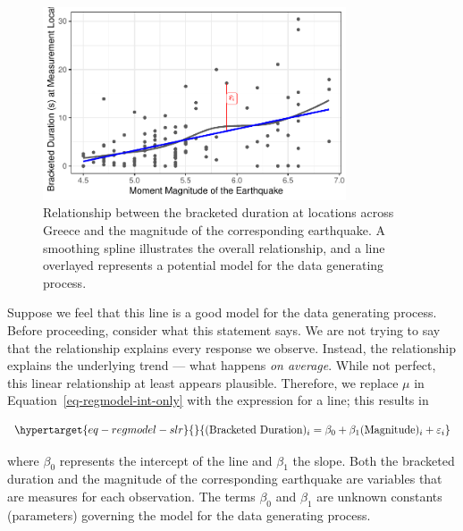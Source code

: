 \documentclass[
  letterpaper,
  DIV=11,
  numbers=noendperiod]{scrreprt}
\theoremstyle{plain}
\theoremstyle{definition}
\theoremstyle{definition}
\theoremstyle{remark}
\begin{document}
\begin{figure}

{\centering \includegraphics[width=0.8\textwidth,height=\textheight]{./images/fig-regmodel-slr-plot-1.pdf}

}

\caption{\label{fig-regmodel-slr-plot}Relationship between the bracketed
duration at locations across Greece and the magnitude of the
corresponding earthquake. A smoothing spline illustrates the overall
relationship, and a line overlayed represents a potential model for the
data generating process.}

\end{figure}

Suppose we feel that this line is a good model for the data generating
process. Before proceeding, consider what this statement says. We are
not trying to say that the relationship explains every response we
observe. Instead, the relationship explains the underlying trend ---
what happens \emph{on average}. While not perfect, this linear
relationship at least appears plausible. Therefore, we replace \(\mu\)
in Equation~\ref{eq-regmodel-int-only} with the expression for a line;
this results in

\begin{equation}\protect\hypertarget{eq-regmodel-slr}{}{(\text{Bracketed Duration})_i = \beta_0 + \beta_1 (\text{Magnitude})_i + \varepsilon_i}\label{eq-regmodel-slr}\end{equation}

where \(\beta_0\) represents the intercept of the line and \(\beta_1\)
the slope. Both the bracketed duration and the magnitude of the
corresponding earthquake are variables that are measures for each
observation. The terms \(\beta_0\) and \(\beta_1\) are unknown constants
(parameters) governing the model for the data generating process.
\end{document}
